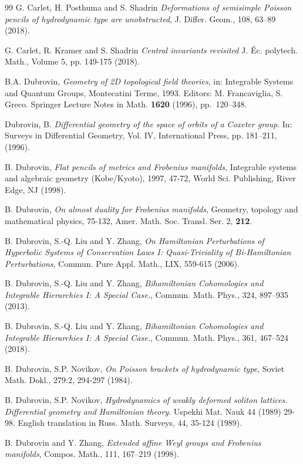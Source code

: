 \documentclass[11pt,a4paper]{amsart}
\numberwithin{equation}{section}
\numberwithin{equation}{section}
\begin{document}
\begin{thebibliography}{99}
G. Carlet, H. Posthuma and S. Shadrin  \emph{Deformations of semisimple Poisson pencils of hydrodynamic type are unobstructed}, J. Differ. Geom., 108, 63–89 (2018).

G. Carlet, R. Kramer and S. Shadrin  \emph{Central invariants revisited}
J. Éc. polytech. Math., Volume 5, pp. 149-175 (2018).

B.A. Dubrovin, \emph{Geometry of 2D topological field theories},
in: Integrable Systems and Quantum Groups, Montecatini Terme, 1993.
Editors: M. Francaviglia, S. Greco. Springer Lecture Notes in
Math. {\bf 1620} (1996), pp.\ 120--348.

Dubrovin, B.  \emph{Differential geometry of the space of orbits of a Coxeter group}. In: Surveys in Differential Geometry, Vol. IV, International Press, pp. 181–211, (1996).

B. Dubrovin, \emph{Flat pencils of metrics and Frobenius manifolds}, Integrable systems and algebraic
geometry (Kobe/Kyoto), 1997, 47-72, World Sci. Publishing, River Edge, NJ (1998).

B. Dubrovin, \emph{On almost duality for Frobenius manifolds}, Geometry, topology
and mathematical physics, 75-132, Amer. Math. Soc. Transl. Ser. 2, {\bf 212}.

B. Dubrovin, S.-Q. Liu and Y. Zhang, \emph{On Hamiltonian Perturbations
of Hyperbolic Systems of Conservation Laws I:
Quasi-Triviality of Bi-Hamiltonian Perturbations}, Commun. Pure Appl. Math., LIX,  559-615 (2006).

B. Dubrovin, S.-Q. Liu and Y. Zhang, \emph{Bihamiltonian Cohomologies and Integrable Hierarchies I: A Special Case.}, Commun. Math. Phys., 324, 897–935 (2013). 

B. Dubrovin, S.-Q. Liu and Y. Zhang, \emph{Bihamiltonian Cohomologies and Integrable Hierarchies I: A Special Case.}, Commun. Math. Phys., 361, 467–524 (2018).

B. Dubrovin, S.P. Novikov, \emph{On Poisson brackets of hydrodynamic type}, Soviet
Math. Dokl., 279:2, 294-297 (1984).

B. Dubrovin, S.P. Novikov, \emph{Hydrodynamics of weakly deformed soliton lattices.
Differential geometry and Hamiltonian theory}. Uspekhi Mat. Nauk 44 (1989) 29-
98. English translation in Russ. Math. Surveys, 44, 35-124 (1989).

B. Dubrovin and Y. Zhang, \emph{Extended affine Weyl groups and Frobenius manifolds}, Compos. Math., 111, 167–219 (1998).


\end{thebibliography}
\end{document}
